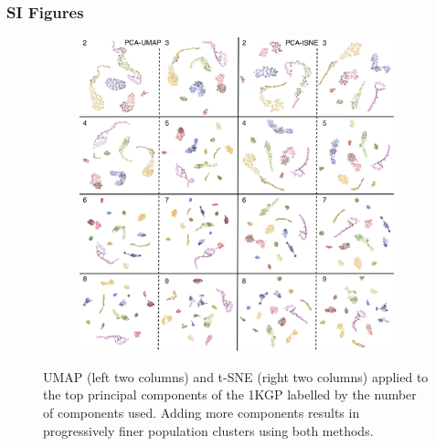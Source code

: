 \documentclass[12pt]{pnas-new}
\begin{document}
\subsubsection*{SI Figures}
\begin{figure}
    \centering
    \begin{subfigure}{\textwidth}
    \includegraphics[width=\textwidth]{images/megamontage_PC2_9.pdf}
    \end{subfigure}
    \caption{UMAP (left two columns) and t-SNE (right two columns) applied to the top principal components of the 1KGP labelled by the number of components used. Adding more components results in progressively finer population clusters using both methods.}
    \label{fig:supp_megamontage_pc2_9}  
\end{figure}
\end{document}
